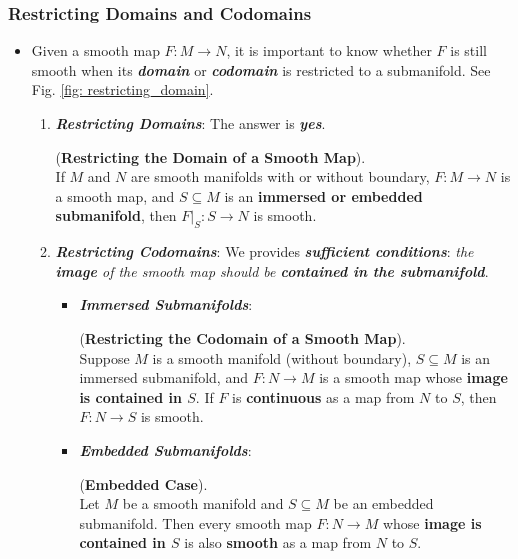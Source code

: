 \documentclass[11pt]{article}
\begin{document}
\subsubsection{Restricting Domains and Codomains}
\begin{itemize}
\item \begin{remark}
Given a smooth map $F: M \rightarrow N$, it is important to know whether $F$ is still smooth when its \emph{\textbf{domain}} or \emph{\textbf{codomain}} is restricted to a submanifold. See Fig. \ref{fig: restricting_domain}.
\begin{enumerate}
\item \emph{\textbf{Restricting Domains}}: The answer is \emph{\textbf{yes}}.
\begin{theorem} (\textbf{Restricting the Domain of a Smooth Map}). \citep{lee2003introduction}\\
If $M$ and $N$ are smooth manifolds with or without boundary, $F: M \rightarrow N$ is a smooth map, and $S \subseteq M$ is an \textbf{immersed or embedded submanifold}, then $F|_{S}: S \rightarrow N$ is smooth.
\end{theorem}

\item  \emph{\textbf{Restricting Codomains}}: We provides \emph{\textbf{sufficient conditions}}: \emph{the \textbf{image} of the smooth map should be \textbf{contained in the submanifold}}.
\begin{itemize}
\item \emph{\textbf{Immersed Submanifolds}}:
\begin{theorem} (\textbf{Restricting the Codomain of a Smooth Map}). \citep{lee2003introduction}\\ 
Suppose $M$ is a smooth manifold (without boundary), $S \subseteq M$ is an immersed submanifold, and $F: N \rightarrow M$ is a smooth map whose \textbf{image is contained in $S$}. If $F$ is \textbf{continuous} as a map from $N$ to $S$, then $F: N \rightarrow S$ is smooth.
\end{theorem}
\item \emph{\textbf{Embedded Submanifolds}}:
\begin{corollary} (\textbf{Embedded Case}). \\
Let $M$ be a smooth manifold and $S \subseteq M$ be an embedded submanifold. Then every smooth map $F: N \rightarrow M$ whose \textbf{image is
contained in $S$} is also \textbf{smooth} as a map from $N$ to $S$.
\end{corollary}
\end{itemize}


\end{enumerate}
\end{remark}
\end{itemize}
\end{document}
